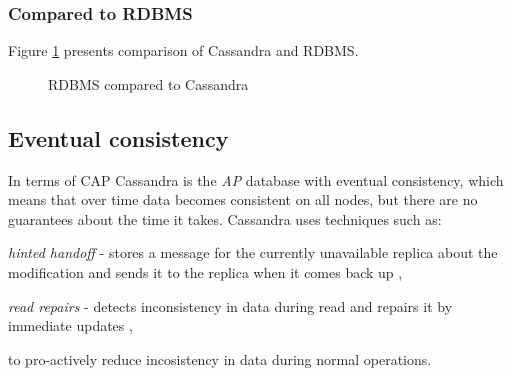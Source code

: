 \subsubsection{Compared to RDBMS}
Figure \ref{fig:cassandraToRdbms} presents comparison of Cassandra and RDBMS.
\begin{figure}[H]
  \setlength{\unitlength}{1.3cm}  
  \caption{RDBMS compared to Cassandra}
  \label{fig:cassandraToRdbms}
\end{figure}

\subsection{Eventual consistency}\label{sec:theory:eventualConsistency}
In terms of CAP \cite{brewer2000towards} \cite{Brewer:2012ba} Cassandra is the \emph{AP} database with eventual consistency, which means that over time data becomes consistent on all nodes, but there are no guarantees about the time it takes. Cassandra uses techniques such as: \begin{enumerate*}[label=\alph*)]
\item \emph{hinted handoff} - stores a message for the currently unavailable replica about the modification and sends it to the replica when it comes back up \cite{CassandraHintedHandoff},  
\item \emph{read repairs} - detects inconsistency in data during read and repairs it by immediate updates \cite{CassandraReadRepair},  \end{enumerate*} to pro-actively reduce incosistency in data during normal operations.
